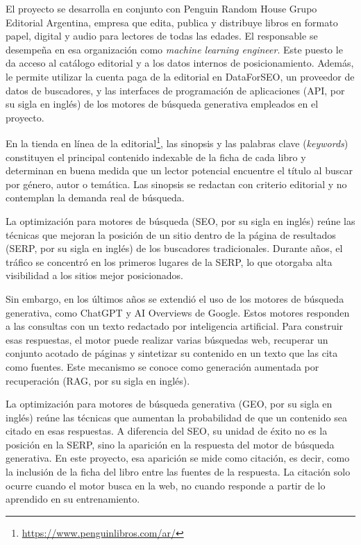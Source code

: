 \documentclass[
11pt, %
codirector, %
]{charter}
\begin{document}
El proyecto se desarrolla en conjunto con Penguin Random House Grupo Editorial Argentina, empresa que edita, publica y distribuye libros en formato papel, digital y audio para lectores de todas las edades. El responsable se desempeña en esa organización como \textit{machine learning engineer}. Este puesto le da acceso al catálogo editorial y a los datos internos de posicionamiento. Además, le permite utilizar la cuenta paga de la editorial en DataForSEO, un proveedor de datos de buscadores, y las interfaces de programación de aplicaciones (API, por su sigla en inglés) de los motores de búsqueda generativa empleados en el proyecto.

En la tienda en línea de la editorial\footnote{\url{https://www.penguinlibros.com/ar/}}, las sinopsis y las palabras clave (\textit{keywords}) constituyen el principal contenido indexable de la ficha de cada libro y determinan en buena medida que un lector potencial encuentre el título al buscar por género, autor o temática. Las sinopsis se redactan con criterio editorial y no contemplan la demanda real de búsqueda.

La optimización para motores de búsqueda (SEO, por su sigla en inglés) reúne las técnicas que mejoran la posición de un sitio dentro de la página de resultados (SERP, por su sigla en inglés) de los buscadores tradicionales. Durante años, el tráfico se concentró en los primeros lugares de la SERP, lo que otorgaba alta visibilidad a los sitios mejor posicionados.

Sin embargo, en los últimos años se extendió el uso de los motores de búsqueda generativa, como ChatGPT y AI Overviews de Google. Estos motores responden a las consultas con un texto redactado por inteligencia artificial. Para construir esas respuestas, el motor puede realizar varias búsquedas web, recuperar un conjunto acotado de páginas y sintetizar su contenido en un texto que las cita como fuentes. Este mecanismo se conoce como generación aumentada por recuperación (RAG, por su sigla en inglés).

La optimización para motores de búsqueda generativa (GEO, por su sigla en inglés) reúne las técnicas que aumentan la probabilidad de que un contenido sea citado en esas respuestas. A diferencia del SEO, su unidad de éxito no es la posición en la SERP, sino la aparición en la respuesta del motor de búsqueda generativa. En este proyecto, esa aparición se mide como citación, es decir, como la inclusión de la ficha del libro entre las fuentes de la respuesta. La citación solo ocurre cuando el motor busca en la web, no cuando responde a partir de lo aprendido en su entrenamiento.
\end{document}
